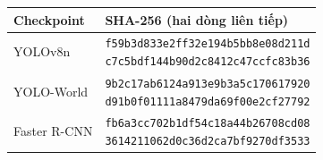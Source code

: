 \begin{tabular}{lp{9cm}}
\toprule
Checkpoint & SHA-256 (hai dòng liên tiếp) \\
\midrule
YOLOv8n & \shortstack[l]{\texttt{f59b3d833e2ff32e194b5bb8e08d211d}\\\texttt{c7c5bdf144b90d2c8412c47ccfc83b36}} \\
YOLO-World & \shortstack[l]{\texttt{9b2c17ab6124a913e9b3a5c170617920}\\\texttt{d91b0f01111a8479da69f00e2cf27792}} \\
Faster R-CNN & \shortstack[l]{\texttt{fb6a3cc702b1df54c18a44b26708cd08}\\\texttt{3614211062d0c36d2ca7bf9270df3533}} \\
\bottomrule
\end{tabular}
